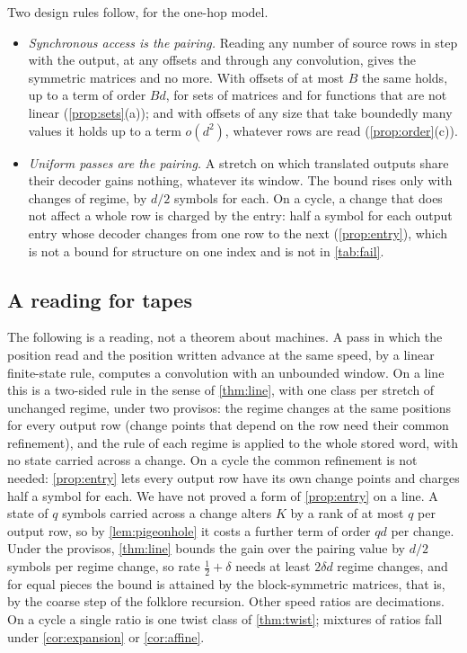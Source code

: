 Two design rules follow, for the one-hop model.
\begin{itemize}[leftmargin=1.5em]
\item \emph{Synchronous access is the pairing.} Reading any number of source rows in step with the output, at any
offsets and through any convolution, gives the symmetric matrices and no more. With offsets of at most $B$ the same
holds, up to a term of order $Bd$, for sets of matrices and for functions that are not linear
(\cref{prop:sets}(a)); and with offsets of any size that take boundedly many values it holds up to a term
$o(d^2)$, whatever rows are read (\cref{prop:order}(c)).
\item \emph{Uniform passes are the pairing.} A stretch on which translated outputs share their decoder gains nothing,
whatever its window. The bound rises only with changes of regime, by $d/2$ symbols for each. On a cycle, a change
that does not affect a whole row is charged by the entry: half a symbol for each output entry whose decoder changes
from one row to the next (\cref{prop:entry}), which is not a bound for structure on one index and is not in
\cref{tab:fail}.
\end{itemize}

\subsection{A reading for tapes}\label{sec:reading}

The following is a reading, not a theorem about machines. A pass in which the position read and the position written
advance at the same speed, by a linear finite-state rule, computes a convolution with an unbounded window. On a line
this is a two-sided rule in the sense of \cref{thm:line}, with one class per stretch of unchanged regime, under two
provisos: the regime changes at the same positions for every output row (change points that depend on the row need
their common refinement), and the rule of each regime is applied to the whole stored word, with no state carried
across a change. On a cycle the common refinement is not needed: \cref{prop:entry} lets every output row have its own
change points and charges half a symbol for each. We have not proved a form of \cref{prop:entry} on a line. A state of $q$ symbols carried across a change alters $K$ by a rank of at most $q$ per output row, so
by \cref{lem:pigeonhole} it costs a further term of order $qd$ per change. Under the provisos, \cref{thm:line} bounds
the gain over the pairing value by $d/2$ symbols per regime change, so rate $\tfrac12+\delta$ needs at least $2\delta d$
regime changes, and for equal pieces the bound is attained by the block-symmetric matrices, that is, by the coarse step
of the folklore recursion. Other speed ratios are decimations. On a cycle a single ratio is one twist class of
\cref{thm:twist}; mixtures of ratios fall under \cref{cor:expansion} or \cref{cor:affine}.

